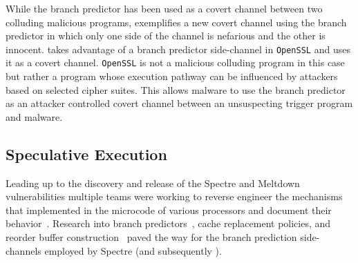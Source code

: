 While the branch predictor has been used as a covert channel between two
colluding malicious programs, \speculake exemplifies a new covert channel using
the branch predictor in which only one side of the channel is nefarious and the
other is innocent. \speculake takes advantage of a branch predictor side-channel
in \texttt{OpenSSL} and uses it as a covert channel. \texttt{OpenSSL} is not a
malicious colluding program in this case but rather a program whose execution
pathway can be influenced by attackers based on selected cipher suites. This
allows malware to use the branch predictor as an attacker controlled covert
channel between an unsuspecting trigger program and \speculake malware.




\subsection{Speculative Execution}

Leading up to the discovery and release of the Spectre and Meltdown
vulnerabilities multiple teams were working to reverse engineer the mechanisms
that implemented in the microcode of various processors and document their
behavior~\cite{intel-instruction-tables,project_zero,measuring-cache,measuring-rob}.
Research into branch predictors~\cite{godbolt2016branch}, cache replacement
policies, and reorder buffer construction~\cite{measuring-rob} paved the way for
the branch prediction side-channels employed by Spectre (and subsequently
\speculake).

